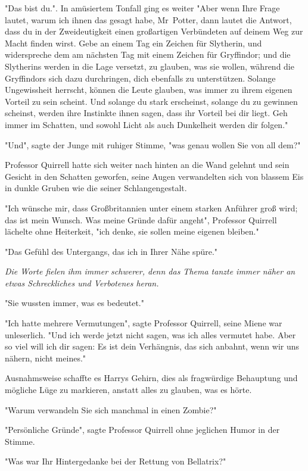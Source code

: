 {"Das bist du.". In amüsiertem Tonfall ging es weiter "Aber wenn Ihre Frage lautet, warum ich ihnen das gesagt habe, Mr~Potter, dann lautet die Antwort, dass du in der Zweideutigkeit einen großartigen Verbündeten auf deinem Weg zur Macht finden wirst. Gebe an einem Tag ein Zeichen für Slytherin, und widerspreche dem am nächsten Tag mit einem Zeichen für Gryffindor; und die Slytherins werden in die Lage versetzt, zu glauben, was sie wollen, während die Gryffindors sich dazu durchringen, dich ebenfalls zu unterstützen. Solange Ungewissheit herrscht, können die Leute glauben, was immer zu ihrem eigenen Vorteil zu sein scheint. Und solange du stark erscheinst, solange du zu gewinnen scheinst, werden ihre Instinkte ihnen sagen, dass ihr Vorteil bei dir liegt. Geh immer im Schatten, und sowohl Licht als auch Dunkelheit werden dir folgen."

"Und", sagte der Junge mit ruhiger Stimme, "was genau wollen Sie von all dem?"

Professor Quirrell hatte sich weiter nach hinten an die Wand gelehnt und sein Gesicht in den Schatten geworfen, seine Augen verwandelten sich von blassem Eis in dunkle Gruben wie die seiner Schlangengestalt.

"Ich wünsche mir, dass Großbritannien unter einem starken Anführer groß wird; das ist mein Wunsch. Was meine Gründe dafür angeht", Professor Quirrell lächelte ohne Heiterkeit, "ich denke, sie sollen meine eigenen bleiben."

"Das Gefühl des Untergangs, das ich in Ihrer Nähe spüre."

\emph{Die Worte fielen ihm immer schwerer, denn das Thema tanzte immer näher an etwas Schreckliches und Verbotenes heran.}

"Sie wussten immer, was es bedeutet."

"Ich hatte mehrere Vermutungen", sagte Professor Quirrell, seine Miene war unleserlich. "Und ich werde jetzt nicht sagen, was ich alles vermutet habe. Aber so viel will ich dir sagen: Es ist dein Verhängnis, das sich anbahnt, wenn wir uns nähern, nicht meines."

Ausnahmsweise schaffte es Harrys Gehirn, dies als fragwürdige Behauptung und mögliche Lüge zu markieren, anstatt alles zu glauben, was es hörte.

"Warum verwandeln Sie sich manchmal in einen Zombie?"

"Persönliche Gründe", sagte Professor Quirrell ohne jeglichen Humor in der Stimme.

"Was war Ihr Hintergedanke bei der Rettung von Bellatrix?"

}
